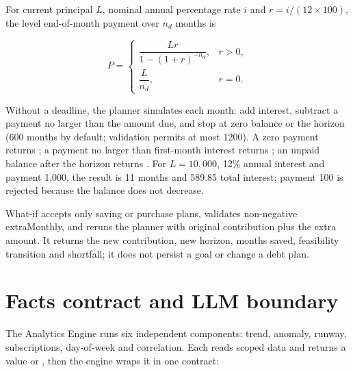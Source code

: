 For current principal $L$, nominal annual percentage rate $i$ and $r=i/(12\times100)$, the level end-of-month payment over $n_d$ months is

\begin{equation}
  P=\begin{cases}
  \dfrac{Lr}{1-(1+r)^{-n_d}}, & r>0,\\[6pt]
  \dfrac{L}{n_d}, & r=0.
  \end{cases}
\end{equation}

Without a deadline, the planner simulates each month: add interest, subtract a payment no larger than the amount due, and stop at zero balance or the horizon (600 months by default; validation permits at most 1200). A zero payment returns ; a payment no larger than first-month interest returns ; an unpaid balance after the horizon returns . For $L=10,000$, 12\% annual interest and payment 1,000, the result is 11 months and 589.85 total interest; payment 100 is rejected because the balance does not decrease.

What-if accepts only saving or purchase plans, validates non-negative extraMonthly, and reruns the planner with original contribution plus the extra amount. It returns the new contribution, new horizon, months saved, feasibility transition and shortfall; it does not persist a goal or change a debt plan.

\section{Facts contract and LLM boundary}
\label{app:facts-contract}

The Analytics Engine runs six independent components: trend, anomaly, runway, subscriptions, day-of-week and correlation. Each reads scoped data and returns a value or , then the engine wraps it in one contract:

